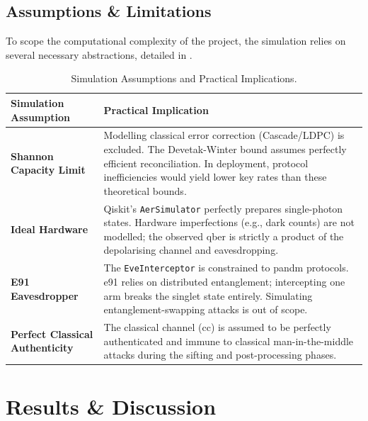 \documentclass[11pt, a4paper]{report}
\renewcommand{\footnotesize}{\fontsize{9}{10}\selectfont}
\begin{document}
\section{Assumptions \& Limitations}
\label{sec:assumptionslimitations}

To scope the computational complexity of the project, the simulation relies on several necessary abstractions, detailed in .

\begin{table}[htbp]
\centering
\caption{Simulation Assumptions and Practical Implications.}
\label{tab:limitations}
\footnotesize
\begin{tabularx}{\linewidth}{@{}l X@{}}
\toprule
\textbf{Simulation Assumption} & \textbf{Practical Implication} \\
\midrule
\textbf{Shannon Capacity Limit} & Modelling classical error correction (Cascade/LDPC) is excluded. The Devetak-Winter bound assumes perfectly efficient reconciliation. In deployment, protocol inefficiencies would yield lower key rates than these theoretical bounds. \\
\addlinespace
\textbf{Ideal Hardware} & Qiskit's \texttt{AerSimulator} perfectly prepares single-photon states. Hardware imperfections (e.g., dark counts) are not modelled; the observed \gls{qber} is strictly a product of the depolarising channel and eavesdropping. \\
\addlinespace
\textbf{E91 Eavesdropper} & The \texttt{EveInterceptor} is constrained to \gls{pandm} protocols. \gls{e91} relies on distributed entanglement; intercepting one arm breaks the singlet state entirely. Simulating entanglement-swapping attacks is out of scope. \\
\addlinespace
\textbf{Perfect Classical Authenticity} & The classical channel (\gls{cc}) is assumed to be perfectly authenticated and immune to classical man-in-the-middle attacks during the sifting and post-processing phases. \\
\bottomrule
\end{tabularx}
\end{table}


\chapter{Results \& Discussion}
\end{document}
